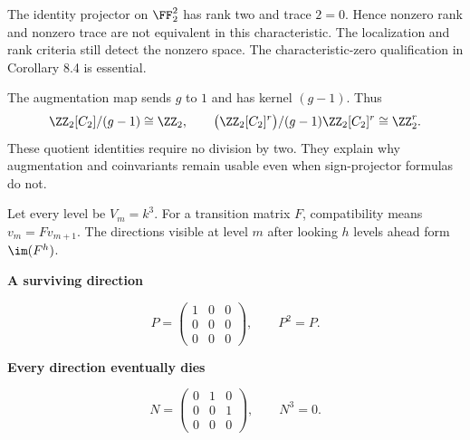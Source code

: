 The identity projector on $\FF_2^2$ has rank two and trace $2=0$. Hence nonzero rank and nonzero trace are not equivalent in this characteristic. The localization and rank criteria still detect the nonzero space. The characteristic-zero qualification in Corollary 8.4 is essential.

The augmentation map sends $g$ to $1$ and has kernel $(g-1)$. Thus
\[
\ZZ_2[C_2]/(g-1)\cong\ZZ_2,
\qquad
\bigl(\ZZ_2[C_2]^r\bigr)/(g-1)\ZZ_2[C_2]^r\cong\ZZ_2^r.
\]
These quotient identities require no division by two. They explain why augmentation and coinvariants remain usable even when sign-projector formulas do not.


Let every level be $V_m=k^3$. For a transition matrix $F$, compatibility means $v_m=Fv_{m+1}$. The directions visible at level $m$ after looking $h$ levels ahead form $\im(F^h)$.

\begin{minipage}[t]{.48\linewidth}\centering
{\sffamily\bfseries A surviving direction}\par
\[
P=\begin{pmatrix}1&0&0\\0&0&0\\0&0&0\end{pmatrix},\qquad P^2=P.
\]
\end{minipage}\hfill
\begin{minipage}[t]{.48\linewidth}\centering
{\sffamily\bfseries Every direction eventually dies}\par
\[
N=\begin{pmatrix}0&1&0\\0&0&1\\0&0&0\end{pmatrix},\qquad N^3=0.
\]
\end{minipage}

